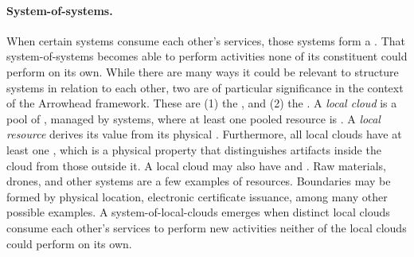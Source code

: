 \paragraph{System-of-systems.}
When certain systems consume each other's services, those systems form a .
That system-of-systems becomes able to perform activities none of its constituent  could perform on its own.
While there are many ways it could be relevant to structure systems in relation to each other, two are of particular significance in the context of the Arrowhead framework.
These are (1) the , and (2) the .
A \textit{local cloud} is a pool of , managed by systems, where at least one pooled resource is .
A \textit{local resource} derives its value from its physical .
Furthermore, all local clouds have at least one , which is a physical property that distinguishes artifacts inside the cloud from those outside it.
A local cloud may also have  and .
Raw materials, drones, and other systems are a few examples of resources.
Boundaries may be formed by physical location, electronic certificate issuance, among many other possible examples.
A system-of-local-clouds emerges when distinct local clouds consume each other's services to perform new activities neither of the local clouds could perform on its own.
